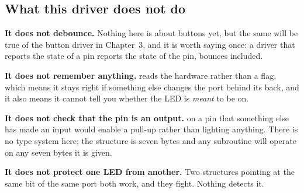 \subsection{What this driver does not do}
\label{c2:sec:notdo}
\textbf{It does not debounce.} Nothing here is about buttons yet, but the same will be true of the
button driver in Chapter~3, and it is worth saying once: a driver that reports the state of a pin
reports the state of the pin, bounces included.

\textbf{It does not remember anything.}  reads the hardware rather than a flag,
which means it stays right if something else changes the port behind its back, and it also means
it cannot tell you whether the LED is \emph{meant} to be on.

\textbf{It does not check that the pin is an output.}  on a pin that something else
has made an input would enable a pull-up rather than lighting anything. There is no type system
here; the structure is seven bytes and any subroutine will operate on any seven bytes it is given.

\textbf{It does not protect one LED from another.} Two structures pointing at the same bit of the
same port both work, and they fight. Nothing detects it.
